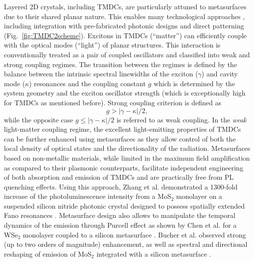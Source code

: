 \documentclass[journal=chreay,manuscript=review]{achemso}
\begin{document}
Layered 2D crystals, including TMDCs, are particularly attuned to metasurfaces due to their shared planar nature. This enables many technological approaches \cite{mupparapu2020integration}, including integration with pre-fabricated photonic designs and direct patterning (Fig.~\ref{fig:TMDC2scheme}). Excitons in TMDCs (``matter'') can efficiently couple with the optical modes (``light'') of planar structures. This interaction is conventionally treated as a pair of coupled oscillators and classified into weak and strong coupling regimes. The transition between the regimes is defined by the balance between the intrinsic spectral linewidths of the exciton ($\gamma$) and cavity mode ($\kappa$) resonances and the coupling constant $g$ which is determined by the system geometry and the exciton oscillator strength (which is exceptionally high for TMDCs as mentioned before). Strong coupling criterion is defined as
\begin{equation}
 g >  |\gamma-\kappa|/2,
\end{equation}
while the opposite case $g \leq  |\gamma-\kappa|/2$ is referred to as weak coupling.  In the \textit{weak} light-matter coupling regime, the excellent light-emitting properties of TMDCs can be further enhanced using metasurfaces as they allow control of both the local density of optical states and the directionality of the radiation. Metasurfaces based on non-metallic materials, while limited in the maximum field amplification as compared to their plasmonic counterparts, facilitate independent engineering of both absorption and emission of TMDCs and are practically free from PL quenching effects. Using this approach, Zhang et al. demonstrated a 1300-fold increase of the photoluminescence intensity from a MoS$_2$ monolayer on a suspended silicon nitride photonic crystal designed to possess spatially extended Fano resonances \cite{zhang2017unidirectional}. Metasurface design also allows to manipulate the temporal dynamics of the emission through Purcell effect as shown by Chen et al. for a WSe$_2$ monolayer coupled to a silicon metasurface \cite{chen2017enhanced}. Bucher et al. observed strong (up to two orders of magnitude) enhancement, as well as spectral and directional reshaping of emission of MoS$_2$ integrated with a silicon metasurface \cite{bucher2019tailoring}.
\end{document}
